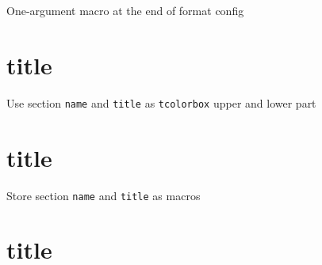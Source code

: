 \documentclass{article}
\begin{document}
\tableofcontents

\newpage
\begin{example}{One-argument macro at the end of format config}
  \newcommand\sectionFormat[1]{%
    \tcbox[on line]{#1}%
  }
  
  \section{title}
\end{example}

\begin{example}{Use section \texttt{name} and \texttt{title} as \texttt{tcolorbox} upper and lower part}
  \newcommand\sectionFormat[1]{%
    \begin{tcolorbox}[sidebyside, lefthand ratio=0.2]
      #1
  }
  \section{title}
\end{example}


\begin{example}{Store section \texttt{name} and \texttt{title} as macros}
  \newcommand\storeContents[2]{\long\gdef#1{#2}}
  
  \section{title}
\end{example}
\end{document}
